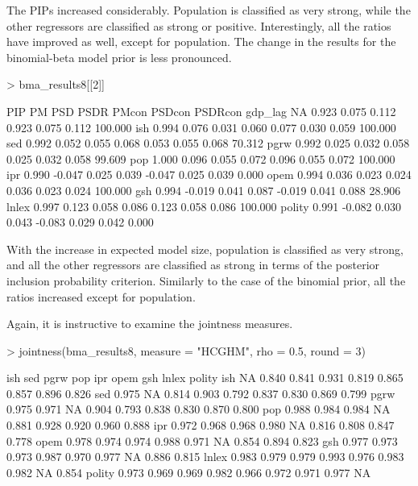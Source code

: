 \documentclass[a4paper]{article}
\begin{document}
\noindent The PIPs increased considerably.
Population is classified as very strong, while the other regressors are classified as strong or positive.
Interestingly, all the ratios have improved as well, except for population.
The change in the results for the binomial-beta model prior is less pronounced.
\begin{Schunk}
\begin{Sinput}
> bma_results8[[2]]
\end{Sinput}
\begin{Soutput}
          PIP     PM   PSD  PSDR  PMcon PSDcon PSDRcon    %
gdp_lag    NA  0.923 0.075 0.112  0.923  0.075   0.112 100.000
ish     0.994  0.076 0.031 0.060  0.077  0.030   0.059 100.000
sed     0.992  0.052 0.055 0.068  0.053  0.055   0.068  70.312
pgrw    0.992  0.025 0.032 0.058  0.025  0.032   0.058  99.609
pop     1.000  0.096 0.055 0.072  0.096  0.055   0.072 100.000
ipr     0.990 -0.047 0.025 0.039 -0.047  0.025   0.039   0.000
opem    0.994  0.036 0.023 0.024  0.036  0.023   0.024 100.000
gsh     0.994 -0.019 0.041 0.087 -0.019  0.041   0.088  28.906
lnlex   0.997  0.123 0.058 0.086  0.123  0.058   0.086 100.000
polity  0.991 -0.082 0.030 0.043 -0.083  0.029   0.042   0.000
\end{Soutput}
\end{Schunk}

\noindent With the increase in expected model size, population is classified as very strong,
and all the other regressors are classified as strong in terms of the posterior inclusion probability criterion.
Similarly to the case of the binomial prior, all the ratios increased except for population.

Again, it is instructive to examine the jointness measures.
\begin{Schunk}
\begin{Sinput}
> jointness(bma_results8, measure = "HCGHM", rho = 0.5, round = 3)
\end{Sinput}
\begin{Soutput}
         ish   sed  pgrw   pop   ipr  opem   gsh lnlex polity
ish       NA 0.840 0.841 0.931 0.819 0.865 0.857 0.896  0.826
sed    0.975    NA 0.814 0.903 0.792 0.837 0.830 0.869  0.799
pgrw   0.975 0.971    NA 0.904 0.793 0.838 0.830 0.870  0.800
pop    0.988 0.984 0.984    NA 0.881 0.928 0.920 0.960  0.888
ipr    0.972 0.968 0.968 0.980    NA 0.816 0.808 0.847  0.778
opem   0.978 0.974 0.974 0.988 0.971    NA 0.854 0.894  0.823
gsh    0.977 0.973 0.973 0.987 0.970 0.977    NA 0.886  0.815
lnlex  0.983 0.979 0.979 0.993 0.976 0.983 0.982    NA  0.854
polity 0.973 0.969 0.969 0.982 0.966 0.972 0.971 0.977     NA
\end{Soutput}
\end{Schunk}
\end{document}
